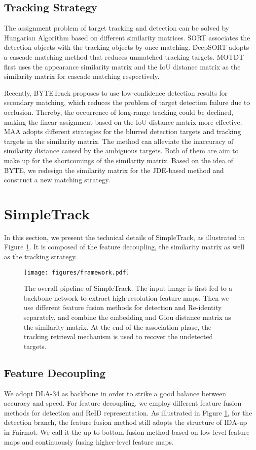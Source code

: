 \documentclass[runningheads]{llncs}
\begin{document}
\subsection{Tracking Strategy}
The assignment problem of target tracking and detection can be solved by Hungarian Algorithm based on different similarity matrices. SORT associates the detection objects with the tracking objects by once matching. DeepSORT adopts a cascade matching method that reduces unmatched tracking targets. MOTDT\cite{chen2018real} first uses the appearance similarity matrix and the IoU distance matrix as the similarity matrix for cascade matching respectively.

Recently, BYTETrack\cite{zhang2021bytetrack} proposes to use low-confidence detection results for secondary matching, which reduces the problem of target detection failure due to occlusion. Thereby, the occurrence of long-range tracking could be declined, making the linear assignment based on the IoU distance matrix more effective. MAA\cite{stadler2022modelling} adopts different strategies for the blurred detection targets and tracking targets in the similarity matrix. The method can alleviate the inaccuracy of similarity distance caused by the ambiguous targets. Both of them are aim to make up for the shortcomings of the similarity matrix. Based on the idea of BYTE\cite{zhang2021bytetrack}, we redesign the similarity matrix for the JDE-based method and construct a new matching strategy.

\section{SimpleTrack}
In this section, we present the technical details of SimpleTrack, as illustrated in Figure \ref{fig:framework}. It is composed of the feature decoupling, the similarity matrix as well as the tracking strategy.  
\begin{figure}
\centering
\texttt{[image: figures/framework.pdf]}
\caption{The overall pipeline of SimpleTrack. The input image is first fed to a backbone network to extract high-resolution feature maps. Then we use different feature fusion methods for detection and Re-identity separately, and combine the embedding and Giou distance matrix as the similarity matrix. At the end of the association phase, the tracking retrieval mechanism is used to recover the undetected targets.}
\label{fig:framework}
\end{figure}
\subsection{Feature Decoupling}
We adopt DLA-34 as backbone in order to strike a good balance between accuracy and speed. For feature decoupling, we employ different feature fusion methods for detection and ReID representation. As illustrated in Figure \ref{fig:framework}, for the detection branch, the feature fusion method still adopts the structure of IDA-up in Fairmot\cite{zhang2021fairmot}. We call it the up-to-bottom fusion method based on low-level feature maps and continuously fusing higher-level feature maps.
\end{document}
